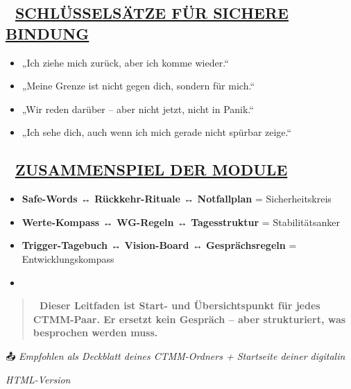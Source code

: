 \hypertarget{schluxfcsselsuxe4tze-fuxfcr-sichere-bindung}{%
\subsection{\texorpdfstring{\textbf{💬 \ul{SCHLÜSSELSÄTZE FÜR SICHERE BINDUNG}}}{💬 SCHLÜSSELSÄTZE FÜR SICHERE BINDUNG}}\label{schluxfcsselsuxe4tze-fuxfcr-sichere-bindung}}

\begin{itemize}
\tightlist
\item
  „Ich ziehe mich zurück, aber ich komme wieder.``
\item
  „Meine Grenze ist nicht gegen dich, sondern für mich.``
\item
  „Wir reden darüber -- aber nicht jetzt, nicht in Panik.``
\item
  „Ich sehe dich, auch wenn ich mich gerade nicht spürbar zeige.``
\end{itemize}

\hypertarget{zusammenspiel-der-module}{%
\subsection{\texorpdfstring{\textbf{🔗 \ul{ZUSAMMENSPIEL DER MODULE}}}{🔗 ZUSAMMENSPIEL DER MODULE}}\label{zusammenspiel-der-module}}

\begin{itemize}
\tightlist
\item
  \textbf{Safe-Words ↔ Rückkehr-Rituale ↔ Notfallplan} = Sicherheitskreis
\item
  \textbf{Werte-Kompass ↔ WG-Regeln ↔ Tagesstruktur} = Stabilitätsanker
\item
  \textbf{Trigger-Tagebuch ↔ Vision-Board ↔ Gesprächsregeln} = Entwicklungskompass
\item
\end{itemize}

\begin{quote}
\textbf{📎 Dieser Leitfaden ist Start- und Übersichtspunkt für jedes CTMM-Paar. Er ersetzt kein Gespräch -- aber strukturiert, was besprochen werden muss.}
\end{quote}

📤 \emph{Empfohlen als Deckblatt deines CTMM-Ordners + Startseite deiner digitalin}

\emph{HTML-Version}


